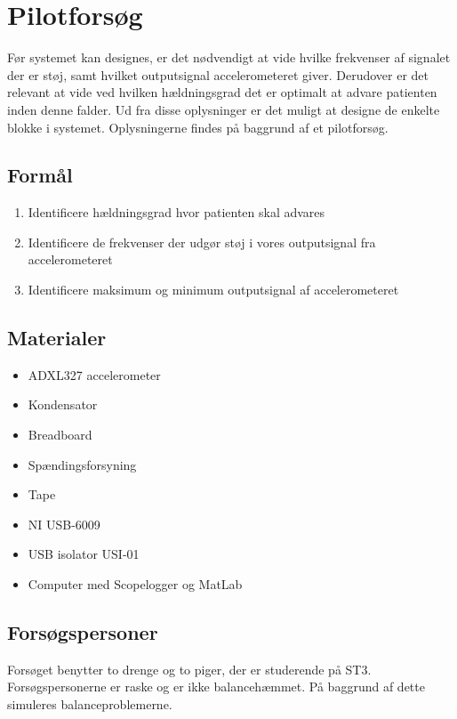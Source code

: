 \section{Pilotforsøg}
Før systemet kan designes, er det nødvendigt at vide hvilke frekvenser af signalet der er støj, samt hvilket outputsignal accelerometeret giver. Derudover er det relevant at vide ved hvilken hældningsgrad det er optimalt at advare patienten inden denne falder. Ud fra disse oplysninger er det muligt at designe de enkelte blokke i systemet. Oplysningerne findes på baggrund af et pilotforsøg. 

\subsection{Formål}
\begin{enumerate}
\item Identificere hældningsgrad hvor patienten skal advares
\item Identificere de frekvenser der udgør støj i vores outputsignal fra accelerometeret
\item Identificere maksimum og minimum outputsignal af accelerometeret
\end{enumerate}

\subsection{Materialer}
\begin{itemize}
\item ADXL327 accelerometer
\item Kondensator
\item Breadboard
\item Spændingsforsyning
\item Tape
\item NI USB-6009
\item USB isolator USI-01
\item Computer med Scopelogger og MatLab
\end{itemize}

\subsection{Forsøgspersoner}
Forsøget benytter to drenge og to piger, der er studerende på ST3. Forsøgspersonerne er raske og er ikke balancehæmmet. På baggrund af dette simuleres balanceproblemerne. 

